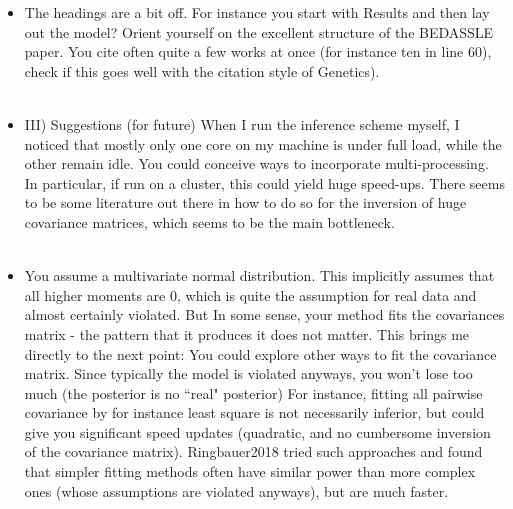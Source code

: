 \documentclass[11pt]{letter}
\newcommand{\gb}[1]{{\bf\color{black}{#1}}}
\begin{document}
\begin{itemize}
\item The headings are a bit off. 
For instance you start with Results and then lay out the model? 
Orient yourself on the excellent structure of the BEDASSLE paper.
 You cite often quite a few works at once (for instance ten in line 60), 
 check if this goes well with the citation style of Genetics).\\\\
\gb{These were holdovers from a previous submission format.  
We have edited them for a more logical flow and greater clarity.}

\item III) Suggestions (for future)
 When I run the inference scheme myself, 
 I noticed that mostly only one core on my machine is under full load, while the other remain idle. 
 You could conceive ways to incorporate multi-processing. 
 In particular, if run on a cluster, this could yield huge speed-ups. 
 There seems to be some literature out there in how to do so for the inversion of huge covariance matrices, 
 which seems to be the main bottleneck.\\\\
\gb{Parallelization would definitely be helpful.  
Right now, the inference algorithm is implemented in STAN, 
which doesn't have a mechanism for parallelizing a single MCMC chain.
But, as you say, there are algorithms for parallelizing matrix inversions calculations, 
so we might look to porting the inference out of STAN to get greater speedups for future releases.}
 
 \item You assume a multivariate normal distribution. 
 This implicitly assumes that all higher moments are 0, 
 which is quite the assumption for real data and almost certainly violated. 
 But In some sense, your method fits the covariances matrix - the pattern that it produces it does not matter. 
 This brings me directly to the next point:
 You could explore other ways to fit the covariance matrix. 
 Since typically the model is violated anyways, 
 you won't lose too much (the posterior is no ``real" posterior)
For instance, fitting all pairwise covariance by for instance least square 
is not necessarily inferior, but could give you significant speed updates 
(quadratic, and no cumbersome inversion of the covariance matrix).
Ringbauer2018 tried such approaches and found 
that simpler fitting methods often have similar power than more complex ones 
(whose assumptions are violated anyways), but are much faster.\\\\
\gb{This is a nice idea, and one that we will definitely look into.
We've talked about including a ``fast" conStruct option  
that uses a maximum-likelihood algorithm in a future release, 
and possibly one that uses the TreeMix trick of modeling each cell in the 
sample covariance matrix as a draw from a Normal with a mean given by the 
corresponding cell in the parametric covariance matrix, 
and a standard deviation calculated from by block-boostrapping the genome.
Your suggestion to use least squares would probably be even faster.}
 

\end{itemize}
\end{document}
